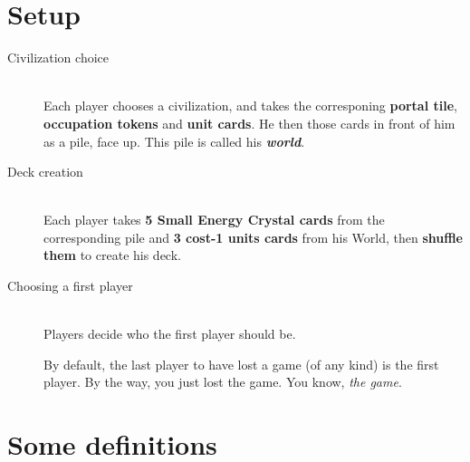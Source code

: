 \documentclass[a4paper]{article}
\begin{document}
\newpage
\section{Setup}

    \begin{description}
        \item[Civilization choice] \hfill \\
            Each player chooses a civilization, and takes the corresponing
            \textbf{portal tile}, \textbf{occupation tokens} and \textbf{unit cards}.
            He then those cards in front of him as a pile, face up.
            This pile is called his \textit{\textbf{world}}.
        \item[Deck creation] \hfill \\
            Each player takes \textbf{5 Small Energy Crystal cards}
            from the corresponding pile and \textbf{3 cost-1 units cards} from his World,
            then \textbf{shuffle them} to create his deck.
        \item[Choosing a first player] \hfill \\
            Players decide who the first player should be.
            
            By default, the last player to have lost a game (of any kind) is the first player.
            By the way, you just lost the game. You know, \textit{the game}.
    \end{description}


\section{Some definitions}
\end{document}

